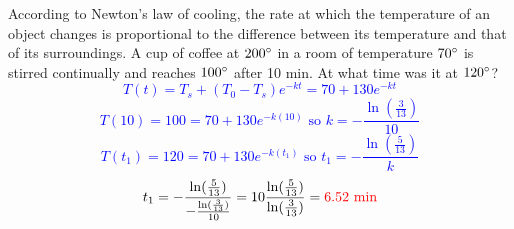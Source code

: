 \item [27.] According to Newton’s law of cooling, the rate at which the temperature of an object changes is proportional to the difference between its temperature and that of its surroundings. A cup of coffee at $200 ^\circ$ in a room of temperature $70 ^\circ$ is stirred continually and reaches $100 ^\circ$ after 10 min. At what time was it at $120 ^\circ$?
\textcolor{blue}{
\[
    T(t) = T_s +(T_0-T_s)e^{-kt} = 70+130e^{-kt}
\]
\[
    T(10) = 100 = 70+130e^{-k(10)} \text{ so } k= -\frac{\ln(\frac{3}{13})}{10} 
\]
\[
    T(t_1) = 120 = 70+130e^{-k(t_1)} \text{ so } t_1 = -\frac{\ln(\frac{5}{13})}{k} 
\]
\[
     t_1 = -\frac{\ln(\frac{5}{13})}{-\frac{\ln(\frac{3}{13})}{10}} =10\frac{\ln(\frac{5}{13})}{\ln(\frac{3}{13})} = \textcolor{red}{6.52 \text{ min}}
\]
}

